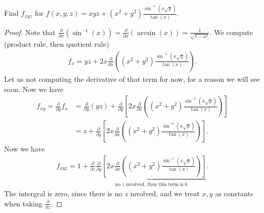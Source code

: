 \begin{example} Find $f_{xyz}$ for $f(x,y,z)= xyz + (x^2+y^2) \frac{\sin^{-1}(x\sqrt{y})}{\tan(x)}$. 
\end{example}
\begin{proof} Note that $\frac{\partial}{\partial x}(\sin^{-1}(x)) = \frac{\partial}{\partial x}(\arcsin(x)) = \frac{1}{\sqrt{1-x^2}}$. We compute (product rule, then quotient rule)
\begin{align*}
    f_x = yz + 2x \frac{\partial }{\partial x} \left((x^2+y^2) \frac{\sin^{-1}(x\sqrt{y})}{\tan(x)}\right).
\end{align*}
Let us not computing the derivative of that term for now, for a reason we will see soon. Now we have
\begin{align*}
    f_{xy} = \frac{\partial}{\partial y} f_x 
    &= \frac{\partial}{\partial y} (yz) + \frac{\partial}{\partial y}\left[2x \frac{\partial }{\partial x} \left((x^2+y^2) \frac{\sin^{-1}(x\sqrt{y})}{\tan(x)}\right)\right] \\
    &= z + \frac{\partial}{\partial y}\left[2x \frac{\partial }{\partial x} \left((x^2+y^2) \frac{\sin^{-1}(x\sqrt{y})}{\tan(x)}\right)\right].
\end{align*}
Now we have
\begin{align*}
    f_{xyz} = 1 + \frac{\partial}{\partial z} \underbrace{\frac{\partial}{\partial y}\left[2x \frac{\partial }{\partial x} \left((x^2+y^2) \frac{\sin^{-1}(x\sqrt{y})}{\tan(x)}\right)\right]}_{\text{no $z$ involved, thus this term is}\;0 }.
\end{align*}
The intergral is zero, since there is no $z$ involved, and we treat $x,y$ as constants when taking $\frac{\partial}{\partial z}$.
\end{proof}

